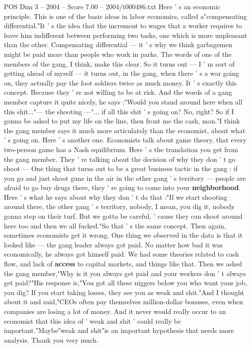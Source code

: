 \begin{textsample}{POS Dim 3 – 2004 – Score 7.00 – 2004/t000486.txt}
Here ' s an economic principle.
This is one of the basic ideas in labor economics, called a"compensating differential."It ' s the idea that the increment to wages that a worker requires to leave him indifferent between performing two tasks, one which is more unpleasant than the other.
Compensating differential — it ' s why we think garbagemen might be paid more than people who work in parks.
The words of one of the members of the gang, I think, make this clear.
So it turns out — I ' m sort of getting ahead of myself — it turns out, in the gang, when there ' s a war going on, they actually pay the foot soldiers twice as much money.
It ' s exactly this concept.
Because they ' re not willing to be at risk.
And the words of a gang member capture it quite nicely, he says :"Would you stand around here when all this shit..."— the shooting —"... if all this shit ' s going on?
No, right?
So if I gonna be asked to put my life on the line, then front me the cash, man."I think the gang member says it much more articulately than the economist, about what ' s going on.
Here ' s another one.
Economists talk about game theory, that every two-person game has a Nash equilibrium.
Here ' s the translation you get from the gang member.
They ' re talking about the decision of why they don ' t go shoot — One thing that turns out to be a great business tactic in the gang : if you go and just shoot guns in the air in the other gang ' s territory — people are afraid to go buy drugs there, they ' re going to come into your \textbf{neighborhood}.
Here ' s what he says about why they don ' t do that :"If we start shooting around there, the other gang ' s territory, nobody, I mean, you dig it, nobody gonna step on their turf.
But we gotta be careful, ' cause they can shoot around here too and then we all fucked."So that ' s the same concept.
Then again, sometimes economists get it wrong.
One thing we observed in the data is that it looked like — the gang leader always got paid.
No matter how bad it was economically, he always got himself paid.
We had some theories related to cash flow, and lack of \textbf{access} to capital markets, and things like that.
Then we asked the gang member,"Why is it you always get paid and your workers don ' t always get paid?"His response is,"You got all these niggers below you who want your job, you dig?
If you start taking losses, they see you as weak and shit."And I thought about it and said,"CEOs often pay themselves million-dollar bonuses, even when companies are losing a lot of money.
And it never would really occur to an economist that this idea of ' weak and shit ' could really be important."Maybe"weak and shit"is an important hypothesis that needs more analysis.
Thank you very much.

\end{textsample}
